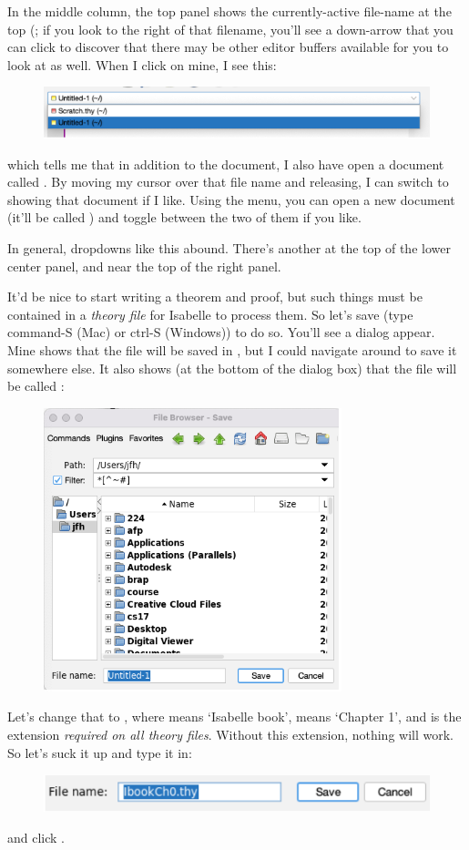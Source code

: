 In the middle column, the top panel shows the currently-active file-name at the top (; if you look to the right of that filename, you'll see a down-arrow that you can click to discover that there may be other editor buffers available for you to look at as well. When I click on mine, I see this:
\begin{figure}
    \centering
    \includegraphics[width=1\linewidth]{TEXT/C01//Images/file-list.png}
\end{figure}
which tells me that in addition to the  document, I also have open a document called . By moving my cursor over that file name and releasing, I can switch to showing that document if I like. Using the  menu, you can open a new document (it'll be called ) and toggle between the two of them if you like.

In general, dropdowns like this abound. There's another at the top of the lower center panel, and near the top of the right panel. 

It'd be nice to start writing a theorem and proof, but such things must be contained in a \textit{theory file} for Isabelle to process them. So let's save  (type command-S (Mac) or ctrl-S (Windows)) to do so. You'll see a dialog appear. Mine shows that the file will be saved in , but I could navigate around to save it somewhere else. It also shows (at the bottom of the dialog box) that the file will be called :
\begin{figure}[h]
    \centering
    \includegraphics[width=0.5\linewidth]{TEXT/C01//Images/file-chooser.png}
\end{figure}
Let's change that to , where  means `Isabelle book',  means `Chapter 1', and  is the extension \textit{required on all theory files}. Without this extension, nothing will work. So let's suck it up and type it in:
\begin{figure}[h]
    \centering
    \includegraphics[width=0.75\linewidth]{TEXT/C01//Images/file-name-edit.png}
\end{figure}
and click . 

